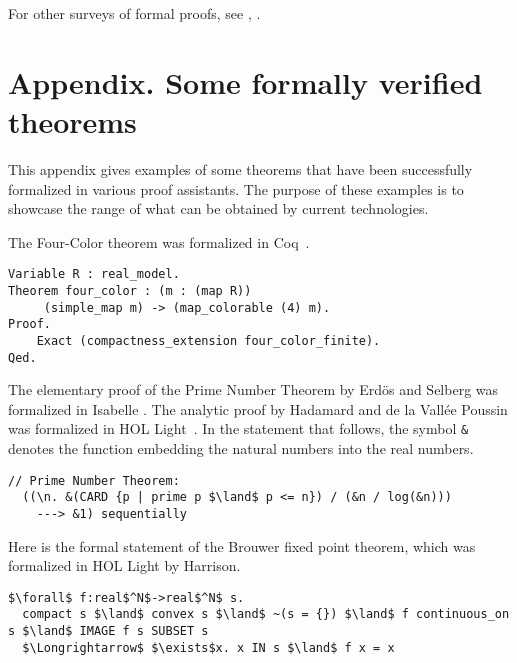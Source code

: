 \documentclass[brochure,english,12pt]{bourbaki}
\theoremstyle{plain}
\begin{document}
For other surveys of formal proofs, see \cite{avigad2014formally},
\cite{Hales:2008:formal}.

\section{Appendix. Some formally verified theorems}


This appendix gives examples of some theorems that have
been successfully formalized in various proof assistants.  The purpose
of these examples is to showcase the range of what can be obtained by
current technologies.


The Four-Color theorem was formalized in Coq~\cite{gonthier2008formal}.



\begin{lstlisting}[keepspaces=true,stringstyle=\tt,basicstyle=\small,frame=single,framesep=8pt,morekeywords={Variable,Theorem,Proof,Qed},columns=flexible]
Variable R : real_model. 
Theorem four_color : (m : (map R))
     (simple_map m) -> (map_colorable (4) m). 
Proof.
    Exact (compactness_extension four_color_finite). 
Qed.
\end{lstlisting}


The elementary proof of the Prime Number Theorem by Erd\"os and
Selberg was formalized in Isabelle \cite{avigad2007formally}.  The
analytic proof by Hadamard and de la Vall\'ee Poussin was formalized
in HOL Light~\cite{harrison2009formalizing}. In the statement that
follows, the symbol \verb!&! denotes the function embedding the
natural numbers into the real numbers.

\begin{lstlisting}[keepspaces=true,stringstyle=\tt,basicstyle=\small,frame=single,framesep=8pt,mathescape,morekeywords={},columns=flexible]
  // Prime Number Theorem:
  ((\n. &(CARD {p | prime p $\land$ p <= n}) / (&n / log(&n)))
    ---> &1) sequentially
\end{lstlisting}

Here is the formal statement of the Brouwer fixed point theorem, which was formalized in HOL Light by Harrison.

\begin{lstlisting}[keepspaces=true,stringstyle=\tt,basicstyle=\small,frame=single,framesep=8pt,mathescape,morekeywords={},columns=flexible]
  $\forall$ f:real$^N$->real$^N$ s. 
  compact s $\land$ convex s $\land$ ~(s = {}) $\land$ f continuous_on s $\land$ IMAGE f s SUBSET s
  $\Longrightarrow$ $\exists$x. x IN s $\land$ f x = x
\end{lstlisting}
\end{document}
